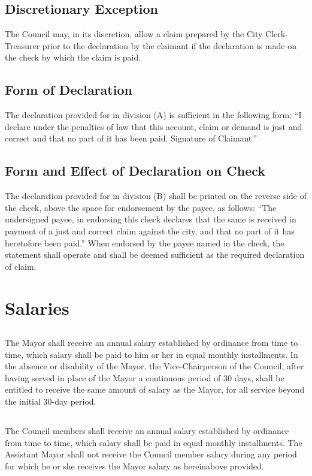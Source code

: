 \subsection{Discretionary Exception} The Council may, in its discretion, allow a claim prepared by the City Clerk-Treasurer prior to the declaration by the claimant if the declaration is made on the check by which the claim is paid.
\subsection{Form of Declaration} The declaration provided for in division (A) is sufficient in the following form: “I declare under the penalties of law that this account, claim or demand is just and correct and that no part of it has been paid. Signature of Claimant.”
\subsection{Form and Effect of Declaration on Check} The declaration provided for in division (B) shall be printed on the reverse side of the check, above the space for endorsement by the payee, as follows: “The undersigned payee, in endorsing this check declares that the same is received in payment of a just and correct claim against the city, and that no part of it has heretofore been paid.” When endorsed by the payee named in the check, the statement shall operate and shall be deemed sufficient as the required declaration of claim.

\section{Salaries}
\subsection{}
The Mayor shall receive an annual salary established by ordinance from time to time, which salary shall be paid to him or her in equal monthly installments.  In the absence or disability of the Mayor, the Vice-Chairperson of the Council, after having served in place of the Mayor a continuous period of 30 days, shall be entitled to receive the same amount of salary as the Mayor, for all service beyond the initial 30-day period.
\subsection{}
The Council members shall receive an annual salary established by ordinance from time to time, which salary shall be paid in equal monthly installments.  The Assistant Mayor shall not receive the Council member salary during any period for which he or she receives the Mayor salary as hereinabove provided.
